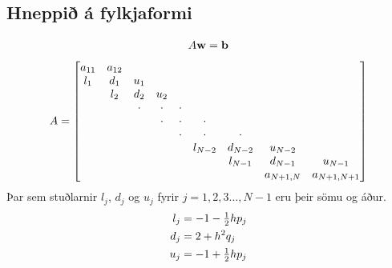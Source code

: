 \documentclass[letterpaper,10pt,icelandic]{sphinxmanual}
\begin{document}
\subsection{Hneppið á fylkjaformi}
\label{kafli07:hneppi-a-fylkjaformi}\begin{gather}
\begin{split}A{\mbox{${\bf w}$}}={\mbox{${\bf b}$}}\end{split}\notag
\end{gather}\begin{gather}
\begin{split}A=\left[\begin{matrix}
a_{11}&a_{12}\\
l_1&d_1&u_1\\
&l_2&d_2&u_2\\
&&\cdot&\cdot&\cdot \\
&&&\cdot&\cdot&\cdot \\
&&&&\cdot&\cdot&\cdot \\
&&&&&l_{N-2}&d_{N-2}&u_{N-2} \\
&&&&&&l_{N-1}&d_{N-1}&u_{N-1} \\
&&&&&&&a_{N+1,N}&a_{N+1,N+1}
\end{matrix}\right]\end{split}\notag
\end{gather}
Þar sem stuðlarnir \(l_j\), \(d_j\) og \(u_j\) fyrir
\(j=1,2,3\dots,N-1\) eru þeir sömu og áður.
\begin{gather}
\begin{split}\begin{aligned}
  l_j&=-1-\tfrac 12 hp_j\\
d_j&=2+h^2q_j\\
u_j&=-1+\tfrac 12 hp_j\end{aligned}\end{split}\notag
\end{gather}
\end{document}
